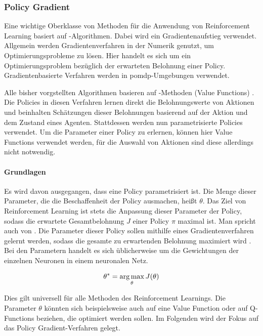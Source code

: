 \subsubsection{Policy Gradient}
Eine wichtige Oberklasse von Methoden für die Anwendung von Reinforcement Learning basiert auf -Algorithmen. Dabei wird ein Gradientenaufstieg verwendet. Allgemein werden Gradientenverfahren in der Numerik genutzt, um Optimierungsprobleme zu lösen. Hier handelt es sich um ein Optimierungsproblem bezüglich der erwarteten Belohnung einer Policy. Gradientenbasierte Verfahren werden in \ac{pomdp}-Umgebungen verwendet.

Alle bisher vorgstellten Algorithmen basieren auf -Methoden (Value Functions) \cite{reinforcement_introduction_book}. Die Policies in diesen Verfahren lernen direkt die Belohnungswerte von Aktionen und beinhalten Schätzungen dieser Belohnungen basierend auf der Aktion und dem Zustand eines Agenten. Stattdessen werden nun parametrisierte Policies verwendet. Um die Parameter einer Policy zu erlernen, können hier Value Functions verwendet werden, für die Auswahl von Aktionen sind diese allerdings nicht notwendig.


\paragraph{Grundlagen}
Es wird davon ausgegangen, dass eine Policy parametrisiert ist. Die Menge dieser Parameter, die die Beschaffenheit der Policy ausmachen, heißt $\theta$. Das Ziel von Reinforcement Learning ist stets die Anpassung dieser Parameter der Policy, sodass die erwartete Gesamtbelohnung $J$ einer Policy $\pi$ maximal ist. Man spricht auch von . Die Parameter dieser Policy sollen mithilfe eines Gradientenverfahren gelernt werden, sodass die gesamte zu erwartenden Belohnung maximiert wird \cite{reinforcement_introduction_book} \cite{tds_policygradient}. Bei den Parametern handelt es sich üblicherweise um die Gewichtungen der einzelnen Neuronen in einem neuronalen Netz.

$$   \theta^* = \operatorname*{arg\,max}_{\theta} J(\theta)   $$

Dies gilt universell für alle Methoden des Reinforcement Learnings. Die Parameter $\theta$ könnten sich beispielsweise auch auf eine Value Function oder auf Q-Functions beziehen, die optimiert werden sollen. Im Folgenden wird der Fokus auf das Policy Gradient-Verfahren gelegt.




